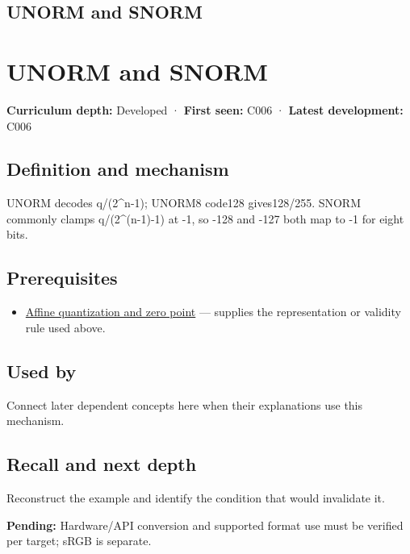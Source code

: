 \hypertarget{appendix-b2402c453dac}{}
\section*{UNORM and SNORM}
\chapter{UNORM and SNORM}\label{appendix-b2402c453dac-unorm-and-snorm}

\textbf{Curriculum depth:} Developed · \textbf{First seen:} C006 · \textbf{Latest development:} C006

\section{Definition and mechanism}\label{appendix-b2402c453dac-definition-and-mechanism}

UNORM decodes q/(2\^{}n-1); UNORM8 code128 gives128/255. SNORM commonly clamps q/(2\^{}(n-1)-1) at -1, so -128 and -127 both map to -1 for eight bits.

\section{Prerequisites}\label{appendix-b2402c453dac-prerequisites}

\begin{itemize}
\tightlist
\item
  \hyperref[appendix-d5da3eaabaef]{Affine quantization and zero point} --- supplies the representation or validity rule used above.
\end{itemize}

\section{Used by}\label{appendix-b2402c453dac-used-by}

Connect later dependent concepts here when their explanations use this mechanism.

\section{Recall and next depth}\label{appendix-b2402c453dac-recall-and-next-depth}

Reconstruct the example and identify the condition that would invalidate it.

\textbf{Pending:} Hardware/API conversion and supported format use must be verified per target; sRGB is separate.

